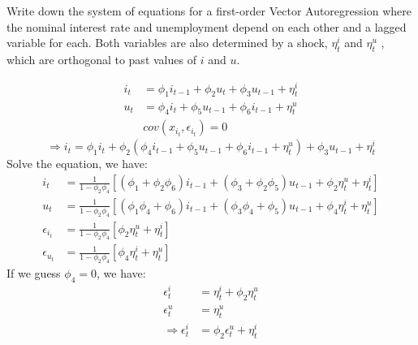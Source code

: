 \begin{problem*}[1]
    Write down the system of equations for a first-order Vector Autoregression 
    where the nominal interest rate and unemployment depend on each other 
    and a lagged variable for each. Both variables are also determined by a shock, 
    $\eta_t^i$ and $\eta_t^u$ , which are orthogonal to past values of $i$ and $u$.
\end{problem*}

\begin{solution}
    \begin{align*}
        i_t &= \phi_1 i_{t-1} + \phi_2 u_t + \phi_3 u_{t-1} + \eta_t^i \\
        u_t &=\phi_4 i_t + \phi_5 u_{t-1} + \phi_6 i_{t-1} + \eta_t^u \\
        & cov(x_{i_t}, \epsilon_{i_t}) = 0
    \end{align*}
    \[
    \Rightarrow i_t = \phi_1 i_t + \phi_2(\phi_4 i_{t-1} + \phi_5 u_{t-1} + \phi_6 i_{t-1} + \eta_t^u) + \phi_3 u_{t-1} + \eta_t^i
    \]
    Solve the equation, we have:
    \begin{align*}
        i_t &= \frac{1}{1-\phi_2 \phi_4} \left[(\phi_{1}+\phi_2 \phi_6)i_{t-1} + (\phi_{3}+\phi_2 \phi_5)u_{t-1} + \phi_2 \eta_t^u + \eta_t^i\right] \\
        u_t &= \frac{1}{1-\phi_2 \phi_4} \left[(\phi_{1} \phi_4 +\phi_6)i_{t-1} + (\phi_{3}\phi_4 +\phi_5)u_{t-1} + \phi_4 \eta_t^i + \eta_t^u\right] \\
        \epsilon_{i_t} &= \frac{1}{1-\phi_2 \phi_4}\left[\phi_2 \eta_t^u + \eta_t^i\right] \\
        \epsilon_{u_t} &= \frac{1}{1-\phi_2 \phi_4}\left[\phi_4 \eta_t^i + \eta_t^u\right]
    \end{align*}
    If we guess $\phi_4 = 0$, we have:
    \begin{align*}
        \epsilon_t^i &= \eta_t^i + \phi_2 \eta_t^u\\
        \epsilon_t^u &= \eta_t^u \\
        \Rightarrow \epsilon_t^i &= \phi_2 \epsilon_t^u + \eta_t^i 
    \end{align*}

\end{solution}